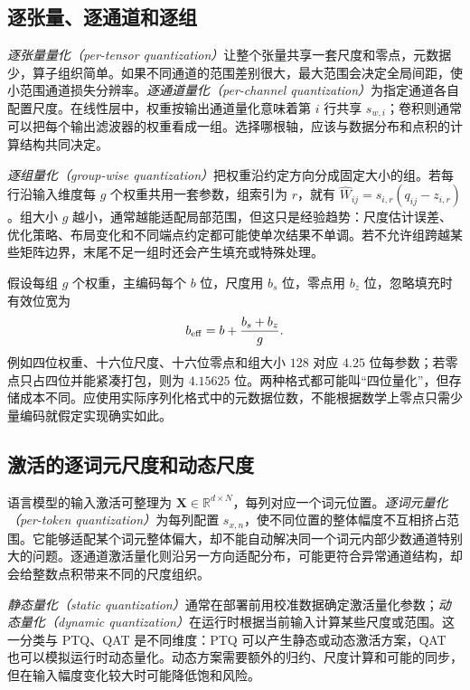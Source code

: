 \documentclass[UTF8,12pt,a4paper,fontset=fandol]{ctexart}
\begin{document}
\subsection{逐张量、逐通道和逐组}
\emph{逐张量量化（per-tensor quantization）}让整个张量共享一套尺度和零点，元数据少，算子组织简单。如果不同通道的范围差别很大，最大范围会决定全局间距，使小范围通道损失分辨率。\emph{逐通道量化（per-channel quantization）}为指定通道各自配置尺度。在线性层中，权重按输出通道量化意味着第 $i$ 行共享 $s_{w,i}$；卷积则通常可以把每个输出滤波器的权重看成一组。选择哪根轴，应该与数据分布和点积的计算结构共同决定。

\emph{逐组量化（group-wise quantization）}把权重沿约定方向分成固定大小的组。若每行沿输入维度每 $g$ 个权重共用一套参数，组索引为 $r$，就有 $\widehat W_{ij}=s_{i,r}(q_{ij}-z_{i,r})$。组大小 $g$ 越小，通常越能适配局部范围，但这只是经验趋势：尺度估计误差、优化策略、布局变化和不同端点约定都可能使单次结果不单调。若不允许组跨越某些矩阵边界，末尾不足一组时还会产生填充或特殊处理。

假设每组 $g$ 个权重，主编码每个 $b$ 位，尺度用 $b_s$ 位，零点用 $b_z$ 位，忽略填充时有效位宽为
\begin{equation}
 b_{\rm eff}=b+\frac{b_s+b_z}{g}.
 \label{eq:quant-effective-bits}
\end{equation}
例如四位权重、十六位尺度、十六位零点和组大小 $128$ 对应 $4.25$ 位每参数；若零点只占四位并能紧凑打包，则为 $4.15625$ 位。两种格式都可能叫“四位量化”，但存储成本不同。应使用实际序列化格式中的元数据位数，不能根据数学上零点只需少量编码就假定实现确实如此。

\subsection{激活的逐词元尺度和动态尺度}
语言模型的输入激活可整理为 $\mathbf X\in\mathbb R^{d\times N}$，每列对应一个词元位置。\emph{逐词元量化（per-token quantization）}为每列配置 $s_{x,n}$，使不同位置的整体幅度不互相挤占范围。它能够适配某个词元整体偏大，却不能自动解决同一个词元内部少数通道特别大的问题。逐通道激活量化则沿另一方向适配分布，可能更符合异常通道结构，却会给整数点积带来不同的尺度组织。

\emph{静态量化（static quantization）}通常在部署前用校准数据确定激活量化参数；\emph{动态量化（dynamic quantization）}在运行时根据当前输入计算某些尺度或范围。这一分类与 PTQ、QAT 是不同维度：PTQ 可以产生静态或动态激活方案，QAT 也可以模拟运行时动态量化。动态方案需要额外的归约、尺度计算和可能的同步，但在输入幅度变化较大时可能降低饱和风险。
\end{document}
